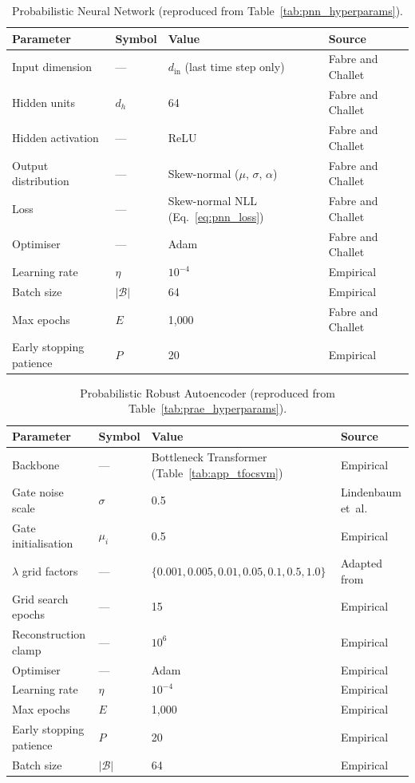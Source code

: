 \documentclass[11pt]{report}
\begin{document}
\begin{table}[H]
\centering
\caption{Probabilistic Neural Network (reproduced from Table~\ref{tab:pnn_hyperparams}).}
\label{tab:app_pnn}
\begin{tabular}{llll}
\toprule
\textbf{Parameter} & \textbf{Symbol} & \textbf{Value} & \textbf{Source} \\
\midrule
Input dimension & --- & $d_{\text{in}}$ (last time step only) & Fabre and Challet~\cite{fabre_2025} \\
Hidden units & $d_h$ & 64 & Fabre and Challet~\cite{fabre_2025} \\
Hidden activation & --- & ReLU & Fabre and Challet~\cite{fabre_2025} \\
Output distribution & --- & Skew-normal ($\mu$, $\sigma$, $\alpha$) & Fabre and Challet~\cite{fabre_2025} \\
Loss & --- & Skew-normal NLL (Eq.~\ref{eq:pnn_loss}) & Fabre and Challet~\cite{fabre_2025} \\
Optimiser & --- & Adam & Fabre and Challet~\cite{fabre_2025} \\
Learning rate & $\eta$ & $10^{-4}$ & Empirical \\
Batch size & $|\mathcal{B}|$ & 64 & Empirical \\
Max epochs & $E$ & 1{,}000 & Fabre and Challet~\cite{fabre_2025} \\
Early stopping patience & $P$ & 20 & Empirical \\
\bottomrule
\end{tabular}
\end{table}

\begin{table}[H]
\centering
\caption{Probabilistic Robust Autoencoder (reproduced from Table~\ref{tab:prae_hyperparams}).}
\label{tab:app_prae}
\begin{tabular}{llll}
\toprule
\textbf{Parameter} & \textbf{Symbol} & \textbf{Value} & \textbf{Source} \\
\midrule
Backbone & --- & Bottleneck Transformer (Table~\ref{tab:app_tfocsvm}) & Empirical \\
Gate noise scale & $\sigma$ & 0.5 & Lindenbaum et~al.~\cite{lindenbaum2022prae} \\
Gate initialisation & $\mu_i$ & 0.5 & Empirical \\
$\lambda$ grid factors & --- & $\{0.001, 0.005, 0.01, 0.05, 0.1, 0.5, 1.0\}$ & Adapted from~\cite{lindenbaum2022prae} \\
Grid search epochs & --- & 15 & Empirical \\
Reconstruction clamp & --- & $10^6$ & Empirical \\
Optimiser & --- & Adam & Empirical \\
Learning rate & $\eta$ & $10^{-4}$ & Empirical \\
Max epochs & $E$ & 1{,}000 & Empirical \\
Early stopping patience & $P$ & 20 & Empirical \\
Batch size & $|\mathcal{B}|$ & 64 & Empirical \\
\bottomrule
\end{tabular}
\end{table}
\end{document}
